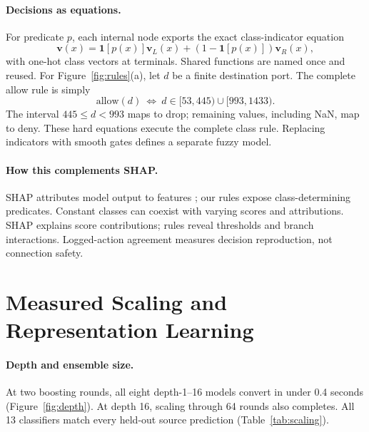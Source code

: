 \paragraph{Decisions as equations.}
For predicate $p$, each internal node exports the exact class-indicator equation
\begin{equation}
\mathbf v(x)=\mathbf1[p(x)]\mathbf v_L(x)
             +(1-\mathbf1[p(x)])\mathbf v_R(x),
\end{equation}
with one-hot class vectors at terminals. Shared functions are named once and reused. For Figure~\ref{fig:rules}(a), let $d$ be a finite destination port. The complete allow rule is simply
\begin{equation}
\mathrm{allow}(d)\ \Longleftrightarrow\
d\in[53,445)\cup[993,1433).
\end{equation}
The interval $445\le d<993$ maps to drop; remaining values, including NaN, map to deny. These hard equations execute the complete class rule. Replacing indicators with smooth gates defines a separate fuzzy model.

\paragraph{How this complements SHAP.}
SHAP attributes model output to features \citep{lundberg2017,lundberg2020}; our rules expose class-determining predicates. Constant classes can coexist with varying scores and attributions. SHAP explains score contributions; rules reveal thresholds and branch interactions. Logged-action agreement measures decision reproduction, not connection safety.


\section{Measured Scaling and Representation Learning}
\paragraph{Depth and ensemble size.}
At two boosting rounds, all eight depth-1--16 models convert in under 0.4 seconds (Figure~\ref{fig:depth}). At depth 16, scaling through 64 rounds also completes. All 13 classifiers match every held-out source prediction (Table~\ref{tab:scaling}).

